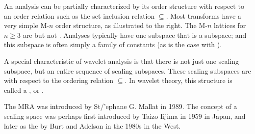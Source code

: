 
    \begin{minipage}{\tw-65mm}%
      An analysis can be partially characterized by its order structure with respect
      to an order relation such as the set inclusion relation $\subseteq$.
      Most transforms have a very simple M-$n$ order structure,
      as illustrated to the right.
      The M-$n$ lattices for $n\ge3$ are  but not .
      Analyses typically have one subspace that is a  subspace;
      and this subspace is often simply a family of constants
      (as is the case with ).
    \end{minipage}%
    \hfill{}%

    \begin{minipage}{\tw-55mm}%
      A special characteristic of wavelet analysis is that there is not just one
      scaling subspace,
      but an entire sequence of scaling subspaces.
      These scaling subspaces are  with respect to the
      ordering relation $\subseteq$. In wavelet theory, this structure is called a ,
      or  .

     The MRA was introduced by St{/'e}phane G. Mallat in 1989.
     The concept of a scaling space was perhaps first introduced by Taizo Iijima in 1959 in Japan,
    and later as the  by Burt and Adelson in the 1980s in the West.\footnotemark
    \end{minipage}%
    \hfill{}%

